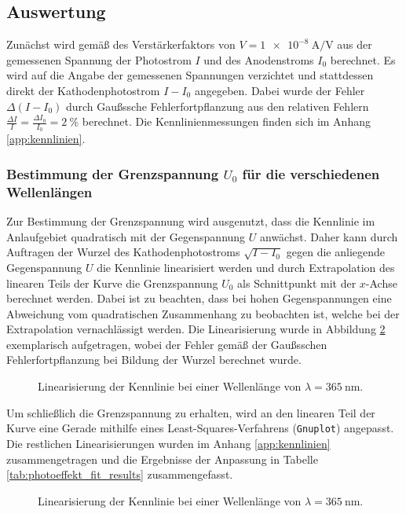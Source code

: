 \documentclass[11pt, a4paper]{article}
\numberwithin{equation}{section}
\begin{document}
\subsection{Auswertung}
Zunächst wird gemäß des Verstärkerfaktors von $V = \SI{1e-8}{\ampere\per\volt}$ aus der gemessenen Spannung der Photostrom $I$ und des Anodenstroms $I_0$ berechnet.
Es wird auf die Angabe der gemessenen Spannungen verzichtet und stattdessen direkt der Kathodenphotostrom $I-I_0$ angegeben.
Dabei wurde der Fehler $\Delta (I - I_0)$ durch Gaußssche Fehlerfortpflanzung aus den relativen Fehlern $\frac{\Delta I}{I} = \frac{\Delta I_0}{I_0} = \SI{2}{\percent}$ berechnet.
Die Kennlinienmessungen finden sich im Anhang \ref{app:kennlinien}.



\subsubsection{Bestimmung der Grenzspannung $U_0$ für die verschiedenen Wellenlängen}
Zur Bestimmung der Grenzspannung wird ausgenutzt, dass die Kennlinie im Anlaufgebiet quadratisch mit der Gegenspannung $U$ anwächst.
Daher kann durch Auftragen der Wurzel des Kathodenphotostroms $\sqrt{I-I_0}$ gegen die anliegende Gegenspannung $U$ die Kennlinie linearisiert werden und durch Extrapolation des linearen Teils der Kurve die Grenzspannung $U_0$ als Schnittpunkt mit der $x$-Achse berechnet werden.
Dabei ist zu beachten, dass bei hohen Gegenspannungen eine Abweichung vom quadratischen Zusammenhang zu beobachten ist, welche bei der Extrapolation vernachlässigt werden.
Die Linearisierung wurde in Abbildung \ref{fig:kennlinien_exemp_365nm} exemplarisch aufgetragen, wobei der Fehler gemäß der Gaußsschen Fehlerfortpflanzung bei Bildung der Wurzel berechnet wurde.
\begin{figure}[h]
	\centering
	
	\caption{Linearisierung der Kennlinie bei einer Wellenlänge von $\lambda = \SI{365}{\nano\metre}$. }
	\label{fig:kennlinien_exemp_365nm}
\end{figure}
Um schließlich die Grenzspannung zu erhalten, wird an den linearen Teil der Kurve eine Gerade mithilfe eines Least-Squares-Verfahrens (\texttt{Gnuplot}) angepasst.
Die restlichen Linearisierungen wurden im Anhang \ref{app:kennlinien} zusammengetragen und die Ergebnisse der Anpassung in Tabelle \ref{tab:photoeffekt_fit_results} zusammengefasst.
\begin{figure}[h]
	\centering
	
	\caption{Linearisierung der Kennlinie bei einer Wellenlänge von $\lambda = \SI{365}{\nano\metre}$. }
	\label{fig:kennlinien_exemp_365nm}
\end{figure}
\end{document}
